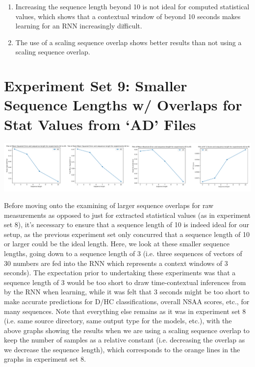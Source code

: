 \documentclass[12pt,twoside]{report}
\begin{document}
\begin{enumerate}
	\item Increasing the sequence length beyond 10 is not ideal for computed statistical values, which shows that a contextual window of beyond 10 seconds makes learning for an RNN increasingly difficult.
	\item The use of a scaling sequence overlap shows better results than not using a scaling sequence overlap.
\end{enumerate}



\section{Experiment Set 9: Smaller Sequence Lengths w/ Overlaps for Stat Values from ‘AD’ Files}

\begin{center}
\includegraphics[scale=0.35]{project_figures/fig10_16}
\end{center}

\quad Before moving onto the examining of larger sequence overlaps for raw measurements as opposed to just for extracted statistical values (as in experiment set 8), it’s necessary to ensure that a sequence length of 10 is indeed ideal for our setup, as the previous experiment set only concurred that a sequence length of 10 or larger could be the ideal length. Here, we look at these smaller sequence lengths, going down to a sequence length of 3 (i.e. three sequences of vectors of 30 numbers are fed into the RNN which represents a context windows of 3 seconds). The expectation prior to undertaking these experiments was that a sequence length of 3 would be too short to draw time-contextual inferences from by the RNN when learning, while it was felt that 3 seconds might be too short to make accurate predictions for D/HC classifications, overall NSAA scores, etc., for many sequences. Note that everything else remains as it was in experiment set 8 (i.e. same source directory, same output type for the models, etc.), with the above graphs showing the results when we are using a scaling sequence overlap to keep the number of samples as a relative constant (i.e. decreasing the overlap as we decrease the sequence length), which corresponds to the orange lines in the graphs in experiment set 8.
\end{document}

